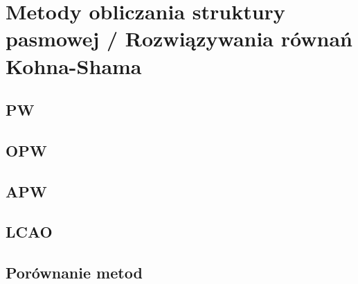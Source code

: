 \section{Metody obliczania struktury pasmowej / Rozwiązywania równań Kohna-Shama}


\subsection{PW}


\subsection{OPW}


\subsection{APW}


\subsection{LCAO}


\subsection{Porównanie metod}


